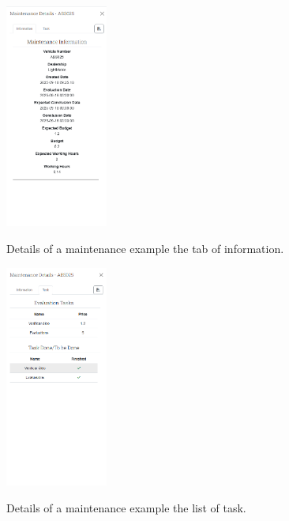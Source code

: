 \begin{figure}[htbp]
  \caption{Details of a maintenance example the tab of information.}
  \centering
  \includegraphics[width=0.30\textwidth]{figs/Implementation/client/MaintenanceDetailsInfo}
  \label{fig:MaintenanceDetailsInfo}
\end{figure}


\begin{figure}[htbp]
  \caption{Details of a maintenance example the list of task.}
  \centering
  \includegraphics[width=0.30\textwidth]{figs/Implementation/client/MaintenanceDetailsTasks}
  \label{fig:MaintenanceDetailsTasks}
\end{figure}




